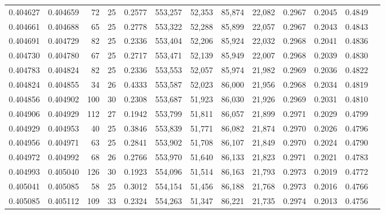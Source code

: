 \begin{tabular}{rrrrrrrrrrrrr}
0.404627 & 0.404659 &    72 &  25 &                                     0.2577 & 553,257 &  52,353 &  85,874 &  22,082 & 0.2967 & 0.2045 & 0.4849 \\
0.404661 & 0.404688 &    65 &  25 &                                     0.2778 & 553,322 &  52,288 &  85,899 &  22,057 & 0.2967 & 0.2043 & 0.4843 \\
0.404691 & 0.404729 &    82 &  25 &                                     0.2336 & 553,404 &  52,206 &  85,924 &  22,032 & 0.2968 & 0.2041 & 0.4836 \\
0.404730 & 0.404780 &    67 &  25 &                                     0.2717 & 553,471 &  52,139 &  85,949 &  22,007 & 0.2968 & 0.2039 & 0.4830 \\
0.404783 & 0.404824 &    82 &  25 &                                     0.2336 & 553,553 &  52,057 &  85,974 &  21,982 & 0.2969 & 0.2036 & 0.4822 \\
0.404824 & 0.404855 &    34 &  26 &                                     0.4333 & 553,587 &  52,023 &  86,000 &  21,956 & 0.2968 & 0.2034 & 0.4819 \\
0.404856 & 0.404902 &   100 &  30 &                                     0.2308 & 553,687 &  51,923 &  86,030 &  21,926 & 0.2969 & 0.2031 & 0.4810 \\
0.404906 & 0.404929 &   112 &  27 &                                     0.1942 & 553,799 &  51,811 &  86,057 &  21,899 & 0.2971 & 0.2029 & 0.4799 \\
0.404929 & 0.404953 &    40 &  25 &                                     0.3846 & 553,839 &  51,771 &  86,082 &  21,874 & 0.2970 & 0.2026 & 0.4796 \\
0.404956 & 0.404971 &    63 &  25 &                                     0.2841 & 553,902 &  51,708 &  86,107 &  21,849 & 0.2970 & 0.2024 & 0.4790 \\
0.404972 & 0.404992 &    68 &  26 &                                     0.2766 & 553,970 &  51,640 &  86,133 &  21,823 & 0.2971 & 0.2021 & 0.4783 \\
0.404993 & 0.405040 &   126 &  30 &                                     0.1923 & 554,096 &  51,514 &  86,163 &  21,793 & 0.2973 & 0.2019 & 0.4772 \\
0.405041 & 0.405085 &    58 &  25 &                                     0.3012 & 554,154 &  51,456 &  86,188 &  21,768 & 0.2973 & 0.2016 & 0.4766 \\
0.405085 & 0.405112 &   109 &  33 &                                     0.2324 & 554,263 &  51,347 &  86,221 &  21,735 & 0.2974 & 0.2013 & 0.4756 \\

\end{tabular}
